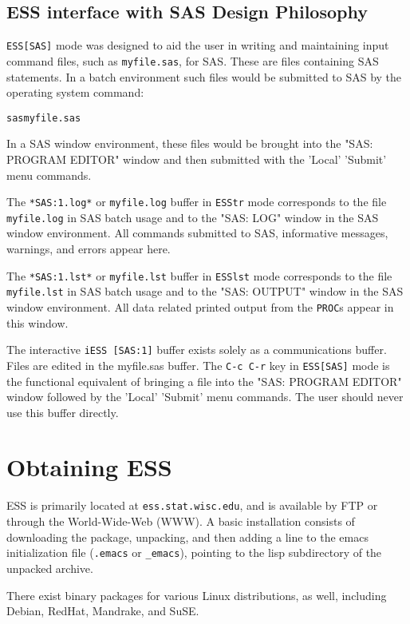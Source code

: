 \documentclass{article}
\newenvironment{Salltt}{\small\begin{alltt}}{\end{alltt}}
\begin{document}
\subsection{ESS interface with SAS Design Philosophy}
\label{sec:SAS:phil}

\texttt{ESS[SAS]} mode was designed to aid the user in writing and maintaining
input command files, such as \texttt{myfile.sas}, for SAS.  These are files
containing SAS statements.  In a batch environment such files would be
submitted to SAS by the operating system command:
\begin{Salltt}
  sas myfile.sas
\end{Salltt}
In a SAS window environment, these files would be brought into the
"SAS: PROGRAM EDITOR" window and then submitted with the 'Local' 'Submit'
menu commands.

The \texttt{*SAS:1.log*} or \texttt{myfile.log} buffer in \texttt{ESStr} mode
corresponds to the file \texttt{myfile.log} in SAS batch usage and to the
"SAS: LOG" window in the SAS window environment.  All commands
submitted to SAS, informative messages, warnings, and errors appear
here.

The \texttt{*SAS:1.lst*} or \texttt{myfile.lst} buffer in \texttt{ESSlst} mode
corresponds to the file \texttt{myfile.lst} in SAS batch usage and to the
"SAS: OUTPUT" window in the SAS window environment.  All data related
printed output from the \texttt{PROC}s appear in this window.

The interactive \texttt{iESS [SAS:1]} buffer exists solely as a communications buffer.
Files are edited in the myfile.sas buffer.  The \texttt{C-c C-r} key in
\texttt{ESS[SAS]} mode is the functional equivalent of bringing a file into the
"SAS: PROGRAM EDITOR" window followed by the 'Local' 'Submit' menu
commands.  The user should never use this buffer directly.

\section{Obtaining ESS}
\label{sec:getIt}

ESS is primarily located at \texttt{ess.stat.wisc.edu}, and is available by FTP
or through the World-Wide-Web (WWW).  A basic installation consists of
downloading the package, unpacking, and then adding a line to the
emacs initialization file (\verb+.emacs+ or \verb+_emacs+), pointing
to the lisp subdirectory of the unpacked archive.

There exist binary packages for various Linux distributions, as well,
including Debian, RedHat, Mandrake, and SuSE.
\end{document}
